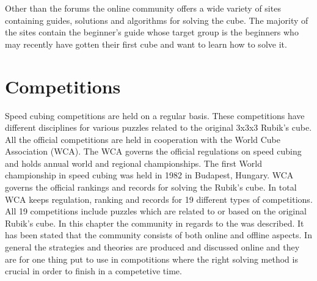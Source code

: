 Other than the forums the online community offers a wide variety of sites containing guides, solutions and algorithms for solving the cube. The majority of the \rubik{} sites contain the beginner's guide\cite{jasminLee08} whose target group is the beginners who may recently have gotten their first cube and want to learn how to solve it. 

\section{Competitions}
\label{sec:wca}
Speed cubing competitions are held on a regular basis\cite{wca/competitions}. These competitions have different disciplines for various puzzles related to the original 3x3x3 Rubik's cube. All the official competitions are held in cooperation with the World Cube Association (WCA). The WCA governs the official regulations on speed cubing and holds annual world and regional championships. The first World championship in speed cubing was held in 1982 in Budapest, Hungary. WCA governs the official rankings and records for solving the Rubik's cube. In total WCA keeps regulation, ranking and records for 19 different types of competitions. All 19 competitions include puzzles which are related to or based on the original Rubik's cube. 
\startTail{}
In this chapter the community in regards to the \rubik{} was described. It has been stated that the community consists of both online and offline aspects. In general the strategies and theories are produced and discussed online and they are for one thing put to use in compotitions where the right solving method is crucial in order to finish in a competetive time.
\endTail{}
%
